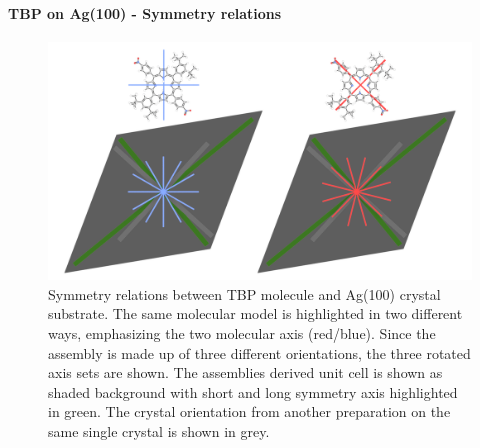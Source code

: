\paragraph{TBP on Ag(100) - Symmetry relations}
	\begin{figure}[]
		\centering
		\includegraphics[width=\textwidth]{./images/F160429-185245-R-model-2-crystal-orientation.png}
		\caption{Symmetry relations between TBP molecule and Ag(100) crystal substrate. The same molecular model is highlighted in two different ways, emphasizing the two molecular axis (red/blue). Since the assembly is made up of three different orientations, the three rotated axis sets are shown. The assemblies derived unit cell is shown as shaded background with short and long symmetry axis highlighted in green. The crystal orientation from another preparation on the same single crystal is shown in grey.}
		\label{F160429-185245-R-model-2-crystal-orientation.png}			
	\end{figure}
	\vfill
\restoregeometry